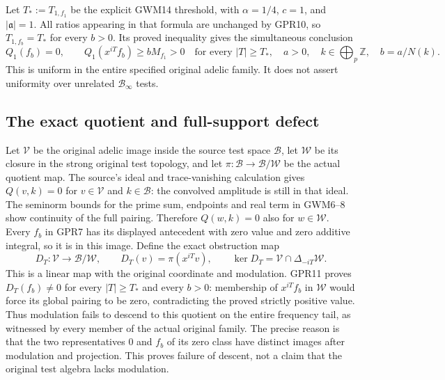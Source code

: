 Let $T_*:=T_{1,f_1}$ be the explicit GWM14 threshold,
with $\alpha=1/4$, $c=1$, and $|\mathfrak a|=1$.
All ratios appearing in that formula are unchanged by
GPR10, so $T_{1,f_b}=T_*$ for every $b>0$. Its proved
inequality gives the simultaneous conclusion
\begin{equation}\tag{GPR11}
 Q_1(f_b)=0,\qquad
 Q_1(x^{iT}f_b)\ge bM_{f_1}>0
 \quad\text{for every }|T|\ge T_*,
 \quad a>0,\quad k\in\bigoplus_p\mathbb Z,\quad b=a/N(k).
\end{equation}
This is uniform in the entire specified original adelic
family. It does not assert uniformity over unrelated
$\mathcal B_\infty$ tests.

\subsection{The exact quotient and full-support defect}

Let $\mathcal V$ be the original adelic image inside the
source test space $\mathcal B$, let $\mathcal W$ be its
closure in the strong original test topology, and let
$\pi:\mathcal B\to\mathcal B/\mathcal W$ be the actual
quotient map. The source's ideal and trace-vanishing
calculation gives $Q(v,k)=0$ for $v\in\mathcal V$ and
$k\in\mathcal B$: the convolved amplitude is still in
that ideal. The seminorm bounds for the prime sum,
endpoints and real term in GWM6--8 show continuity of
the full pairing. Therefore $Q(w,k)=0$ also for
$w\in\mathcal W$.
Every $f_b$ in GPR7 has its displayed antecedent with zero
value and zero additive integral, so it is in this image.
Define the exact obstruction map
\begin{equation}\tag{GPR12}
 D_T:\mathcal V\longrightarrow\mathcal B/\mathcal W,
 \qquad D_T(v)=\pi(x^{iT}v),\qquad
 \ker D_T=\mathcal V\cap\Delta_{-iT}\mathcal W.
\end{equation}
This is a linear map with the original coordinate and
modulation. GPR11 proves
$D_T(f_b)\ne0$ for every $|T|\ge T_*$ and every $b>0$:
membership of $x^{iT}f_b$ in $\mathcal W$ would force its
global pairing to be zero, contradicting the proved
strictly positive value. Thus modulation fails to descend
to this quotient on the entire frequency tail, as witnessed
by every member of the actual original family.
The precise reason is that the two representatives $0$
and $f_b$ of its zero class have distinct images after
modulation and projection. This proves failure of descent,
not a claim that the original test algebra lacks modulation.

